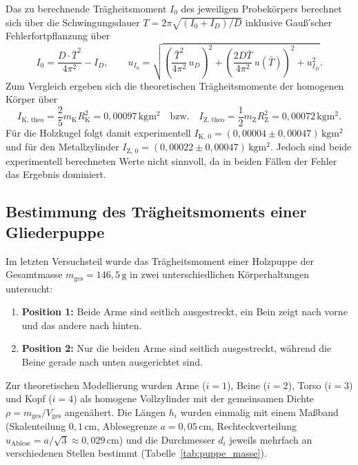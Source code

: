 Das zu berechnende Trägheitsmoment $I_0$ des jeweiligen Probekörpers berechnet sich über die Schwingungsdauer $T = 2\pi\sqrt{(I_0 + I_D)/D}$ inklusive Gauß'scher Fehlerfortpflanzung über
\begin{equation}
	I_0 = \frac{D \cdot \bar{T}^2}{4\pi^2} - I_D, \qquad u_{I_0} = \sqrt{\left(\frac{\bar{T}^2}{4\pi^2}\,u_D\right)^2 + \left(\frac{2 D \bar{T}}{4\pi^2}\,u(\bar{T})\right)^2 + u_{I_D}^2}.
\end{equation}
Zum Vergleich ergeben sich die theoretischen Trägheitsmomente der homogenen Körper über
\begin{equation}
	I_{\text{K, theo}} = \frac{2}{5} m_{\text{K}} R_{\text{K}}^2 = 0{,}00097\,\unit{\kilogram\meter\squared} \quad \text{bzw.} \quad I_{\text{Z, theo}} = \frac{1}{2} m_{\text{Z}} R_{\text{Z}}^2 = 0{,}00072\,\unit{\kilogram\meter\squared}.
\end{equation}
Für die Holzkugel folgt damit experimentell $I_{\text{K, 0}} = (0{,}00004 \pm 0{,}00047)\,\unit{\kilogram\meter\squared}$ und für den Metallzylinder $I_{\text{Z, 0}} = (0{,}00022 \pm 0{,}00047)\,\unit{\kilogram\meter\squared}$. Jedoch sind beide experimentell berechneten Werte nicht sinnvoll, da in beiden Fällen der Fehler das Ergebnis dominiert.

\subsection{Bestimmung des Trägheitsmoments einer Gliederpuppe}

Im letzten Versuchsteil wurde das Trägheitsmoment einer Holzpuppe der Gesamtmasse $m_{\text{ges}} = 146{,}5\,\unit{\gram}$ in zwei unterschiedlichen Körperhaltungen untersucht:
\begin{enumerate}
	\item \textbf{Position 1:} Beide Arme sind seitlich ausgestreckt, ein Bein zeigt nach vorne und das andere nach hinten.
	\item \textbf{Position 2:} Nur die beiden Arme sind seitlich ausgestreckt, während die Beine gerade nach unten ausgerichtet sind.
\end{enumerate}

Zur theoretischen Modellierung wurden Arme ($i=1$), Beine ($i=2$), Torso ($i=3$) und Kopf ($i=4$) als homogene Vollzylinder mit der gemeinsamen Dichte $\rho = m_{\text{ges}} / V_{\text{ges}}$ angenähert. Die Längen $h_i$ wurden einmalig mit einem Maßband (Skalenteilung $0{,}1\,\unit{\centi\meter}$, Ablesegrenze $a = 0{,}05\,\unit{\centi\meter}$, Rechteckverteilung $u_{\text{Ablese}} = a/\sqrt{3} \approx 0{,}029\,\unit{\centi\meter}$) und die Durchmesser $d_i$ jeweils mehrfach an verschiedenen Stellen bestimmt (Tabelle~\ref{tab:puppe_masse}).

